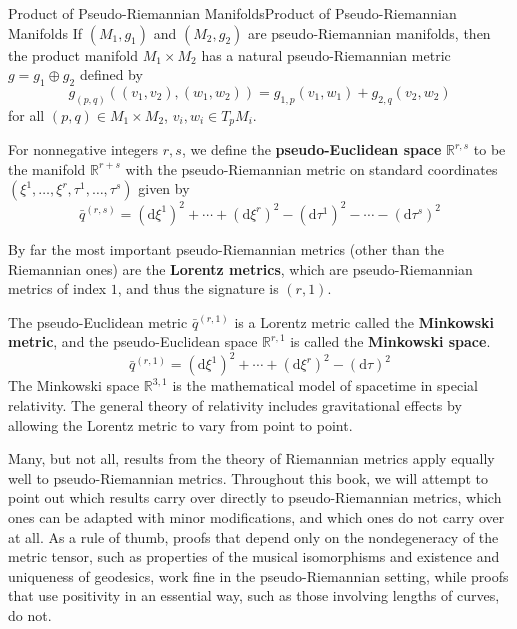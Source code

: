 \documentclass[../main.tex]{subfiles}
\begin{document}
\begin{proposition}{Product of Pseudo-Riemannian Manifolds}{Product of Pseudo-Riemannian Manifolds}
	If $(M_1, g_1)$ and $(M_2, g_2)$ are pseudo-Riemannian manifolds, then the product manifold $M_1 \times M_2$ has a natural pseudo-Riemannian metric $g = g_1 \oplus g_2$ defined by
	\begin{equation}
		g_{(p, q)}((v_1, v_2), (w_1, w_2)) = g_{1, p}(v_1, w_1) + g_{2, q}(v_2, w_2)
	\end{equation}
	for all $(p, q) \in M_1 \times M_2$, $v_i, w_i \in T_pM_i$.
\end{proposition}

For nonnegative integers $r,s$, we define the \textbf{pseudo-Euclidean space} $\mathbb{R}^{r, s}$ to be the manifold $\mathbb{R}^{r+s}$ with the pseudo-Riemannian metric on standard coordinates $(\xi^1, \ldots, \xi^r, \tau^1, \ldots, \tau^s)$ given by
\begin{equation}
	\bar{q}^{(r, s)} = (\mathrm{d}\xi^1)^2 + \cdots + (\mathrm{d}\xi^r)^2 - (\mathrm{d}\tau^1)^2 - \cdots - (\mathrm{d}\tau^s)^2
\end{equation}

By far the most important pseudo-Riemannian metrics (other than the Riemannian ones) are the \textbf{Lorentz metrics}, which are pseudo-Riemannian metrics of index $1$, and thus the signature is $(r, 1)$.

The pseudo-Euclidean metric $\bar{q}^{(r, 1)}$ is a Lorentz metric called the \textbf{Minkowski metric}, and the pseudo-Euclidean space $\mathbb{R}^{r, 1}$ is called the \textbf{Minkowski space}.
\begin{equation}
	\bar{q}^{(r, 1)} = (\mathrm{d}\xi^1)^2 + \cdots + (\mathrm{d}\xi^r)^2 - (\mathrm{d}\tau)^2
\end{equation}
The Minkowski space $\mathbb{R}^{3, 1}$ is the mathematical model of spacetime in special relativity. The general theory of relativity includes gravitational effects by allowing the Lorentz metric to vary from point to point.

\begin{remark}
	Many, but not all, results from the theory of Riemannian metrics apply equally well to pseudo-Riemannian metrics. Throughout this book, we will attempt to point out which results carry over directly to pseudo-Riemannian metrics, which ones can be adapted with minor modifications, and which ones do not carry over at all. As a rule of thumb, proofs that depend only on the nondegeneracy of the metric tensor, such as properties of the musical isomorphisms and existence and uniqueness of geodesics, work fine in the pseudo-Riemannian setting, while proofs that use positivity in an essential way, such as those involving lengths of curves, do not.
\end{remark}
\end{document}

